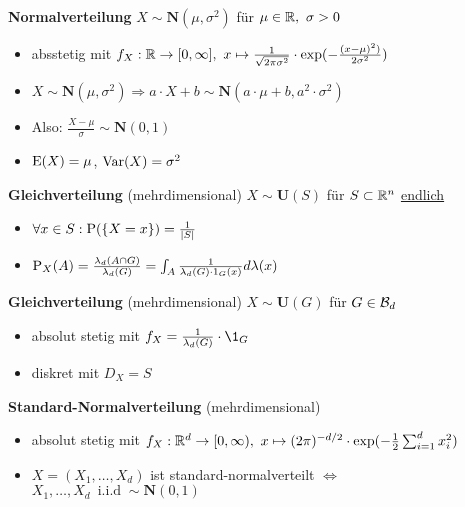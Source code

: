 \textbf{Normalverteilung} $X\sim\mathbf{N}(\mu,\sigma^2)$ für 
$\mu\in\R,\ \sigma>0$
\begin{itemize}
\item absstetig mit $f_X:\R\to[0,\infty],\ 
x\mapsto\frac{1}{\sqrt{2\pi\sigma^2}}\cdot\exp(-\frac{(x-\mu)^2)}{2\sigma^2})$

\item $X\sim\mathbf{N}(\mu,\sigma^2)
\Rightarrow a\cdot X+b\sim\mathbf{N}(a\cdot\mu+b,a^2\cdot\sigma^2)$

\item Also: $\frac{X-\mu}{\sigma}\sim\mathbf{N}(0,1)$

\item $\E(X)=\mu$, $\Var(X)=\sigma^2$
\end{itemize}

\textbf{Gleichverteilung} (mehrdimensional) $X\sim\mathbf{U}(S)$ für $S\subset\R^n$
\underline{endlich}
\begin{itemize}
\item $\forall x\in S: \P(\{X=x\})=\frac{1}{|S|}$

\item $\P_X(A)=\frac{\lambda_d(A\cap G)}{\lambda_d(G)}=
\int_A \frac{1}{\lambda_d(G)\cdot 1_G(x)}d\lambda(x)$
\end{itemize}

\textbf{Gleichverteilung} (mehrdimensional) $X\sim\mathbf{U}(G)$ für $G\in\B{d}$
\begin{itemize}
\item absolut stetig mit $f_X=\frac{1}{\lambda_d(G)}\cdot \1_G$

\item diskret mit $D_X=S$
\end{itemize}

\textbf{Standard-Normalverteilung} (mehrdimensional)
\begin{itemize}
\item absolut stetig mit 
$f_X:\R^d\to [0,\infty),\ 
x\mapsto(2\pi)^{-d/2}\cdot\exp(-\frac{1}{2}\sum_{i=1}^{d}x_i^2)$

\item $X=(X_1,\ldots,X_d)$ ist standard-normalverteilt 
$\Leftrightarrow$ $X_1,\ldots,X_d\ \operatorname{i.i.d}\sim\mathbf{N}(0,1)$
\end{itemize}

